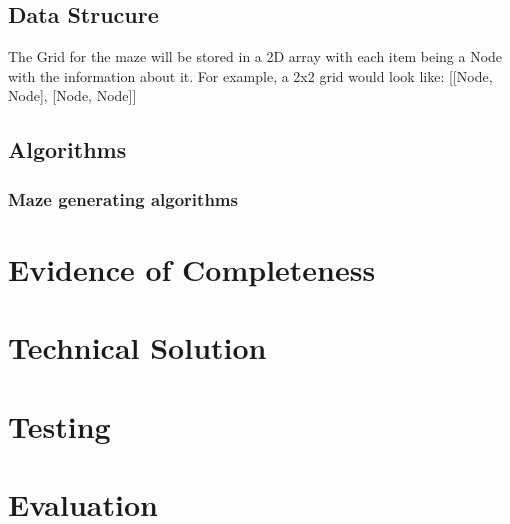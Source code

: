 \documentclass{article}
\begin{document}
\subsection{Data Strucure}
The Grid for the maze will be stored in a 2D array with each item being a Node with the information about it. For example, a 2x2 grid would look like: [[Node, Node], [Node, Node]]

\subsection{Algorithms}
\subsubsection{Maze generating algorithms}

\section{Evidence of Completeness}  

\section{Technical Solution}

\section{Testing}

\section{Evaluation}
\end{document}
